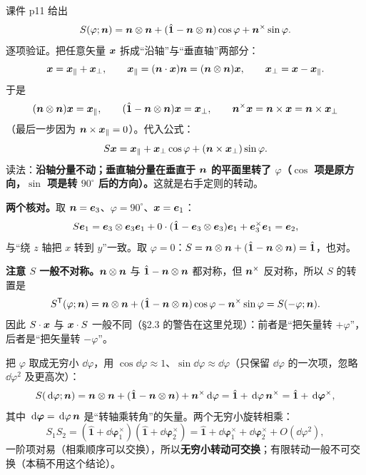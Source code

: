 \documentclass[11pt]{ctexart}
\newcommand{\ten}[1]{\mathbf{#1}}
\newcommand{\unitd}{\hat{\ten{1}}}
\let\origsubhdr\subhdr
\renewcommand{\subhdr}[1]{\par\needspace{3\baselineskip}\origsubhdr{#1}}
\begin{document}
\label{subsec:axisformula}

课件 p11 给出
\[
S(\varphi;\vect n)=\vect n\otimes\vect n+(\unitd-\vect n\otimes\vect n)\cos\varphi+\vect n^{\times}\sin\varphi .
\]
逐项验证。把任意矢量 $\boldsymbol{x}$ 拆成“沿轴”与“垂直轴”两部分：
\[
\boldsymbol{x}=\boldsymbol{x}_\parallel+\boldsymbol{x}_\perp,\qquad
\boldsymbol{x}_\parallel=(\boldsymbol{n}\cdot\boldsymbol{x})\boldsymbol{n}=(\boldsymbol{n}\otimes\boldsymbol{n})\boldsymbol{x},\qquad
\boldsymbol{x}_\perp=\boldsymbol{x}-\boldsymbol{x}_\parallel .
\]
于是
\[
(\vect n\otimes\vect n)\vect x=\vect x_\parallel,\qquad
(\unitd-\vect n\otimes\vect n)\vect x=\vect x_\perp,\qquad
\vect n^{\times}\vect x=\vect n\times\vect x=\vect n\times\vect x_\perp
\]
（最后一步因为 $\boldsymbol{n}\times\boldsymbol{x}_\parallel=0$）。代入公式：
\[
S\boldsymbol{x}=\boldsymbol{x}_\parallel+\boldsymbol{x}_\perp\cos\varphi+(\boldsymbol{n}\times\boldsymbol{x}_\perp)\sin\varphi .
\]
读法：\textbf{沿轴分量不动；垂直轴分量在垂直于 $\boldsymbol{n}$ 的平面里转了 $\varphi$（$\cos$ 项是原方向，$\sin$ 项是转 $90^\circ$ 后的方向）。}这就是右手定则的转动。

\textbf{两个核对。}取 $\boldsymbol{n}=\boldsymbol{e}_3$、$\varphi=90^\circ$、$\boldsymbol{x}=\boldsymbol{e}_1$：
\[
S\vect e_1=\vect e_3\otimes\vect e_3\vect e_1+0\cdot(\unitd-\vect e_3\otimes\vect e_3)\vect e_1+\vect e_3^{\times}\vect e_1=\vect e_2,
\]
与“绕 $z$ 轴把 $x$ 转到 $y$”一致。取 $\varphi=0$：$S=\vect n\otimes\vect n+(\unitd-\vect n\otimes\vect n)=\unitd$，也对。

\textbf{注意 $S$ 一般不对称。}$\boldsymbol{n}\otimes\boldsymbol{n}$ 与 $\unitd-\vect n\otimes\vect n$ 都对称，但 $\boldsymbol{n}^{\times}$ 反对称，所以 $S$ 的转置是
\[
S^{\mathsf T}(\varphi;\vect n)=\vect n\otimes\vect n+(\unitd-\vect n\otimes\vect n)\cos\varphi-\vect n^{\times}\sin\varphi=S(-\varphi;\vect n).
\]
因此 $S\cdot\boldsymbol{x}$ 与 $\boldsymbol{x}\cdot S$ 一般不同（\S2.3 的警告在这里兑现）：前者是“把矢量转 $+\varphi$”，后者是“把矢量转 $-\varphi$”。

\label{subsec:angularvelocity}

把 $\varphi$ 取成无穷小 $\dd\varphi$，用 $\cos\dd\varphi\approx1$、$\sin\dd\varphi\approx\dd\varphi$（只保留 $\dd\varphi$ 的一次项，忽略 $\dd\varphi^2$ 及更高次）：
\[
S(\dd\varphi;\vect n)=\vect n\otimes\vect n+(\unitd-\vect n\otimes\vect n)+\vect n^{\times}\dd\varphi
=\unitd+\dd\varphi\,\vect n^{\times}=\unitd+\dd{\boldsymbol\varphi}^{\times},
\]
其中 $\,\mathrm{d}{\boldsymbol\varphi}=\,\mathrm{d}\varphi\,\boldsymbol{n}$ 是“转轴乘转角”的矢量。两个无穷小旋转相乘：
\[
S_1S_2=(\unitd+\dd{\boldsymbol\varphi}_1^{\times})(\unitd+\dd{\boldsymbol\varphi}_2^{\times})
=\unitd+\dd{\boldsymbol\varphi}_1^{\times}+\dd{\boldsymbol\varphi}_2^{\times}+O(\dd\varphi^2),
\]
一阶项对易（相乘顺序可以交换），所以\textbf{无穷小转动可交换}；有限转动一般不可交换（本稿不用这个结论）。
\end{document}
